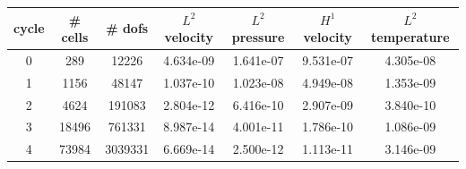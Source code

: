 \documentclass[10pt]{report}
\begin{document}
\begin{table}[H]
\begin{center}
\begin{tabular}{|c|c|c|c|c|c|c|} \hline
cycle & \# cells & \# dofs & $L^2$ velocity & $L^2$ pressure & $H^1$ velocity & $L^2$ temperature\\ \hline
0 & 289 & 12226 & 4.634e-09 & 1.641e-07 & 9.531e-07 & 4.305e-08\\ \hline
1 & 1156 & 48147 & 1.037e-10 & 1.023e-08 & 4.949e-08 & 1.353e-09\\ \hline
2 & 4624 & 191083 & 2.804e-12 & 6.416e-10 & 2.907e-09 & 3.840e-10\\ \hline
3 & 18496 & 761331 & 8.987e-14 & 4.001e-11 & 1.786e-10 & 1.086e-09\\ \hline
4 & 73984 & 3039331 & 6.669e-14 & 2.500e-12 & 1.113e-11 & 3.146e-09\\ \hline
\end{tabular}
\end{center}
\end{table}
\end{document}

